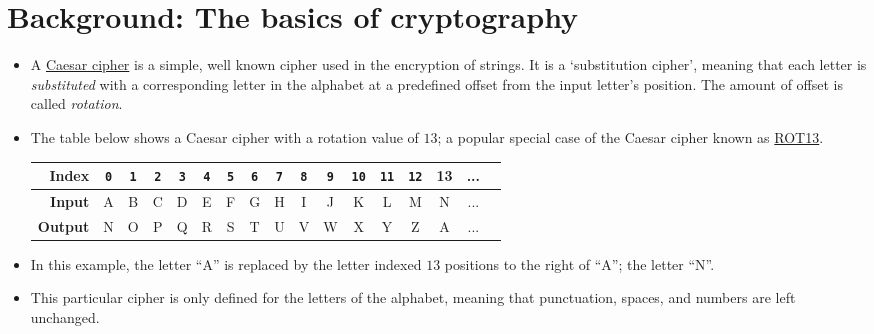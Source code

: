 \documentclass[11pt]{report}
\begin{document}
\section*{Background: The basics of cryptography}
\begin{itemize}
	\item A \href{https://en.wikipedia.org/wiki/Caesar_cipher}{Caesar cipher} is a simple, well known cipher used in the encryption of strings. It is a `substitution cipher', meaning that each letter is \emph{substituted} with a corresponding letter in the alphabet at a predefined offset from the input letter's position. The amount of offset is called \emph{rotation}.\\
	\item The table below shows a Caesar cipher with a rotation value of $13$; a popular special case of the Caesar cipher known as \href{https://www.wikiwand.com/en/ROT13}{ROT13}.
	\begin{table}[h]
		\centering
		\begin{tabular}{|r|c|c|c|c|c|c|c|c|c|c|c|c|c|c|c|c|}
		\hline
		\textbf{Index} & {\tt 0} & {\tt 1} & {\tt 2} & {\tt 3} & {\tt 4} & {\tt 5} & {\tt 6} & {\tt 7} & {\tt 8} & {\tt 9} & {\tt 10} & {\tt 11} & {\tt 12} & 13 & ... \\ \hline
		\textbf{Input} & A & B & C & D & E & F & G & H & I & J & K  & L  & M & N & ... \\ \hline
		\textbf{Output} & N & O & P & Q & R & S & T & U & V & W & X  & Y  & Z & A & ... \\ \hline
		\end{tabular}
	\end{table}
	\item In this example, the letter ``A'' is replaced by the letter indexed $13$ positions to the right of ``A''; the letter ``N''.
	\item This particular cipher is only defined for the letters of the alphabet, meaning that punctuation, spaces, and numbers are left unchanged.
\end{itemize}

\newpage
\end{document}
